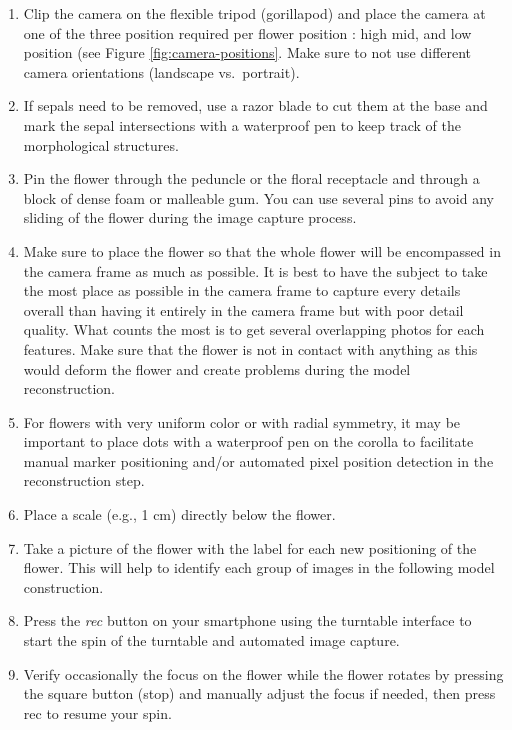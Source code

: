 \documentclass[
]{book}
\begin{document}
\begin{enumerate}
\def\labelenumi{\arabic{enumi}.}
\item
  Clip the camera on the flexible tripod (gorillapod) and place the
  camera at one of the three position required per flower position :
  high mid, and low position (see Figure \ref{fig:camera-positions}.
  Make sure to not use different
  camera orientations (landscape vs.~portrait).
\item
  If sepals need to be removed, use a razor blade to cut them at the
  base and mark the sepal intersections with a waterproof pen to keep
  track of the morphological structures.
\item
  Pin the flower through the peduncle or the floral receptacle and
  through a block of dense foam or malleable gum. You can use several
  pins to avoid any sliding of the flower during the image capture
  process.
\item
  Make sure to place the flower so that the whole flower will be
  encompassed in the camera frame as much as possible. It is best to
  have the subject to take the most place as possible in the camera
  frame to capture every details overall than having it entirely in
  the camera frame but with poor detail quality. What counts the most
  is to get several overlapping photos for each features. Make sure
  that the flower is not in contact with anything as this would deform
  the flower and create problems during the model reconstruction.
\item
  For flowers with very uniform color or with radial symmetry, it may
  be important to place dots with a waterproof pen on the corolla to
  facilitate manual marker positioning and/or automated pixel position
  detection in the reconstruction step.
\item
  Place a scale (e.g., 1 cm) directly below the flower.
\item
  Take a picture of the flower with the label for each new positioning
  of the flower. This will help to identify each group of images in
  the following model construction.
\item
  Press the \emph{rec} button on your smartphone using the turntable
  interface to start the spin of the turntable and automated image
  capture.
\item
  Verify occasionally the focus on the flower while the flower rotates
  by pressing the square button (stop) and manually adjust the focus
  if needed, then press rec to resume your spin.
\end{enumerate}
\end{document}
